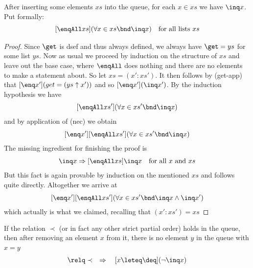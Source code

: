 \begin{lem}
\label{thm:enqAll-inq}
After inserting some elements $xs$ into the queue, for each $x\in xs$ we have
$\inq x$. Put formally:
\[
[\enqAll xs](\forall x\in xs\bnd \inq x) \quad \text{for all lists $xs$}
\]
\end{lem}
\begin{proof}
  Since $\get$ is dsef and thus always defined, we always have $\get = ys$ for
  some list $ys$. Now as usual we proceed by induction on the structure of $xs$ and
  leave out the base case, where $\enqAll$ does nothing and there are no
  elements to make a statement about. So let $xs = (x':xs')$.  It then follows
  by (get-app) that $[\enq x'](get = (ys \uparrow x'))$ and so $[\enq x'](\inq x')$. By
  the induction hypothesis we have
\[
[\enqAll xs'](\forall x\in xs'\bnd \inq x)
\]
and by application of (nec) we obtain
\[
[\enq x'][\enqAll xs'](\forall x\in xs'\bnd \inq x)
\]
The missing ingredient for finishing the proof is
\[
\inq x \Rightarrow [\enqAll xs]\inq x \quad \text{for all $x$ and $xs$}
\]
But this fact is again provable by induction on the mentioned $xs$ and follows
quite directly. Altogether we arrive at
\[
[\enq x'][\enqAll xs'](\forall x\in xs'\bnd \inq x \land \inq x')
\]
which actually is what we claimed, recalling that $(x':xs') = xs$
\end{proof}







\begin{lem}
\label{deq-inq}
If the relation $\prec$ (or in fact any other strict partial order) holds in the
queue, then after removing an element $x$ from it, there is no element $y$ in
the queue with $x = y$
\[
\relq \prec \quad\Rightarrow\quad [x \leteq \deq](\lnot \inq x)
\]
\end{lem}


